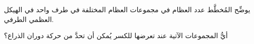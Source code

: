 
\begin{question}

\begin{instance}

\begin{mcq}[standalone=false]

\begin{stem}
يوضِّح المُخطَّط عدد العظام في مجموعات العظام المختلفة في طرف واحد في الهيكل العظمي الطرفي.\par
{}أيُّ المجموعات الآتية عند تعرضها للكسر يُمكن أن تحدَّ من حركة دوران الذراع؟\par

\end{stem}

\begin{distractors}
        
\end{distractors}

\end{mcq}

\end{instance}

\end{question}
